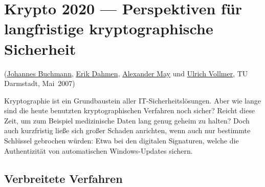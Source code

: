 
\begin{refsegment}

\hypertarget{Chapter_Crypto2020}{}
\chapter{Krypto 2020 --- Perspektiven für langfristige kryptographische
         Sicherheit}
\label{Chapter_Crypto2020}
\begin{sloppypar}
(\hyperlink{author_Johannes-Buchmann}{Johannes Buchmann},
 \hyperlink{author_Erik-Dahmen}{Erik Dahmen},
 \hyperlink{author_Alexander-May}{Alexander May} und
 \hyperlink{author_Ulrich-Vollmer}{Ulrich Vollmer}, TU Darmstadt, Mai~2007)\\
\end{sloppypar}


Kryptographie ist ein Grundbaustein aller IT-Sicherheitslösungen.  Aber
wie lange sind die heute benutzten kryptographischen Verfahren noch
sicher? Reicht diese Zeit, um zum Beispiel medizinische Daten lang genug
geheim zu halten? Doch auch kurzfristig ließe sich großer Schaden
anrichten, wenn auch nur bestimmte Schlüssel gebrochen würden: Etwa bei
den digitalen Signaturen, welche die Authentizität von automatischen
Windows-Updates sichern.


\section{Verbreitete Verfahren}
\label{sec:verfahren}


\end{refsegment}
